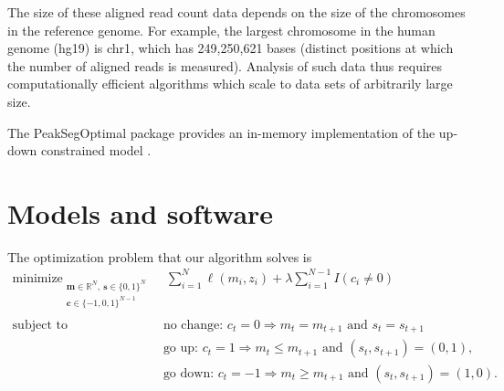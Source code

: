 \documentclass[article]{jss}
\DeclareMathOperator*{\minimize}{minimize}
\newcommand{\RR}{\mathbb R}
\begin{document}
The size of these aligned read count data depends on the size of the
chromosomes in the reference genome. For example, the largest
chromosome in the human genome (hg19) is chr1, which has 249,250,621
bases (distinct positions at which the number of aligned reads is
measured). Analysis of such data thus requires computationally
efficient algorithms which scale to data sets of arbitrarily large
size.


The PeakSegOptimal package provides an in-memory implementation of the
up-down constrained model \citep{Hocking-constrained-changepoint-detection}.



\section{Models and software} \label{sec:models}

The optimization problem that our algorithm solves is
\begin{align*}
  \label{eq:penalized_peakseg}
  \minimize_{
  \substack{
  \mathbf m\in\RR^N,\ \mathbf s\in\{0, 1\}^N\\
  \mathbf c\in\{-1, 0,1\}^{N-1}\\
  }
  } &\ \ 
      \sum_{i=1}^N \ell(m_i, z_i) + \lambda \sum_{i=1}^{N-1} I(c_i \neq 0) \\
  \text{subject to\ \ } &\ \text{no change: }c_t = 0 \Rightarrow m_t = m_{t+1}\text{ and }s_t=s_{t+1}
                          \nonumber\\
    &\ \text{go up: }c_t = 1 \Rightarrow m_t \leq m_{t+1}\text{ and }(s_t,s_{t+1})=(0,1),
      \nonumber\\
    &\ \text{go down: } c_t = -1 \Rightarrow m_t \geq m_{t+1}\text{ and }(s_t,s_{t+1})=(1,0).
      \nonumber
\end{align*}
\end{document}
